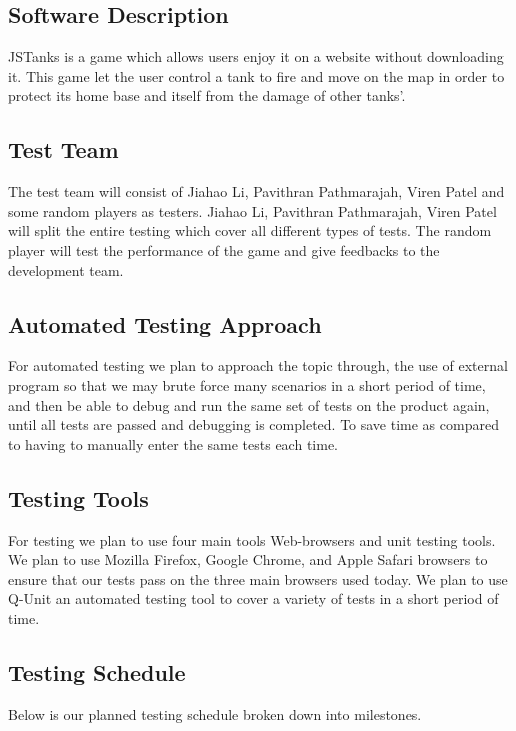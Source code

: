 \documentclass{article}
\begin{document}
\subsection{Software Description}
JSTanks is a game which allows users enjoy it on a website without downloading 
it. This game let the user control a tank to fire and move on the map in order 
to protect its home base and itself from the damage of other tanks'.
\subsection{Test Team}
The test team will consist of Jiahao Li, Pavithran Pathmarajah, Viren Patel 
and some random players as testers. Jiahao Li, Pavithran Pathmarajah, Viren 
Patel will split the entire testing which cover all different types of tests. 
The random player will test the performance of the game and give feedbacks to 
the development team.

\subsection{Automated Testing Approach}
For automated testing we plan to approach the topic through, the use of 
external program so that we may brute force many scenarios in a short period 
of time, and then be able to debug and run the same set of tests on the 
product again, until all tests are passed and debugging is completed. To save 
time as compared to having to manually enter the same tests each time.

\subsection{Testing Tools}
For testing we plan to use four main tools Web-browsers and unit testing 
tools. We plan to use Mozilla Firefox, Google Chrome, and Apple Safari 
browsers to ensure that our tests pass on the three main browsers used today. 
We plan to use Q-Unit an automated testing tool to cover a variety of tests in 
a short period of time. 

\subsection{Testing Schedule}
Below is our planned testing schedule broken down into milestones.
\end{document}

